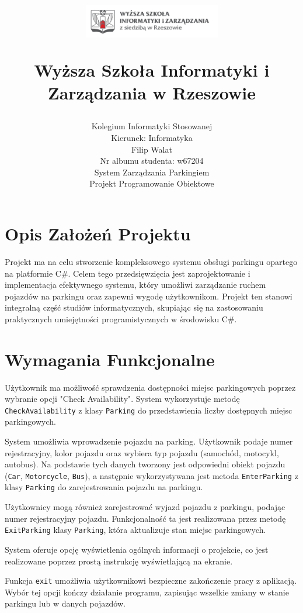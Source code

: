 \documentclass{article}
\title{
    \vspace{-2cm}
    \begin{flushright}
        \includegraphics[width=6cm]{photos/logoWSIiZ.PNG} 
    \end{flushright}
    \vspace{1cm}
    \textbf{Wyższa Szkoła Informatyki i Zarządzania w Rzeszowie} 
    \vspace{1cm}
}
\author{
    \Large Kolegium Informatyki Stosowanej \\
    \normalsize Kierunek: Informatyka \\
    \vspace{1cm}
    \normalsize Filip Walat \\
    \normalsize Nr albumu studenta: w67204 \\
    \vspace{1cm}
    \LARGE System Zarządzania Parkingiem \\
    \vspace{0.5cm}
    \Large Projekt Programowanie Obiektowe
}
\date{
    \vspace{10cm}
    \begin{center}
        \Large Rzeszów 2023
    \end{center}
    \vspace{7cm}
}
\begin{document}
\maketitle

\tableofcontents

\clearpage

\section{Opis Założeń Projektu}
Projekt ma na celu stworzenie kompleksowego systemu obsługi parkingu opartego na platformie C\#. Celem tego przedsięwzięcia jest zaprojektowanie i implementacja efektywnego systemu, który umożliwi zarządzanie ruchem pojazdów na parkingu oraz zapewni wygodę użytkownikom. Projekt ten stanowi integralną część studiów informatycznych, skupiając się na zastosowaniu praktycznych umiejętności programistycznych w środowisku C\#.

\section{Wymagania Funkcjonalne}

Użytkownik ma możliwość sprawdzenia dostępności miejsc parkingowych poprzez wybranie opcji "Check Availability". System wykorzystuje metodę \texttt{CheckAvailability} z klasy \texttt{Parking} do przedstawienia liczby dostępnych miejsc parkingowych.

System umożliwia wprowadzenie pojazdu na parking. Użytkownik podaje numer rejestracyjny, kolor pojazdu oraz wybiera typ pojazdu (samochód, motocykl, autobus). Na podstawie tych danych tworzony jest odpowiedni obiekt pojazdu (\texttt{Car}, \texttt{Motorcycle}, \texttt{Bus}), a następnie wykorzystywana jest metoda \texttt{EnterParking} z klasy \texttt{Parking} do zarejestrowania pojazdu na parkingu.

Użytkownicy mogą również zarejestrować wyjazd pojazdu z parkingu, podając numer rejestracyjny pojazdu. Funkcjonalność ta jest realizowana przez metodę \texttt{ExitParking} klasy \texttt{Parking}, która aktualizuje stan miejsc parkingowych.

System oferuje opcję wyświetlenia ogólnych informacji o projekcie, co jest realizowane poprzez prostą instrukcję wyświetlającą na ekranie.

Funkcja \texttt{exit} umożliwia użytkownikowi bezpieczne zakończenie pracy z aplikacją. Wybór tej opcji kończy działanie programu, zapisując wszelkie zmiany w stanie parkingu lub w danych pojazdów.
\end{document}
